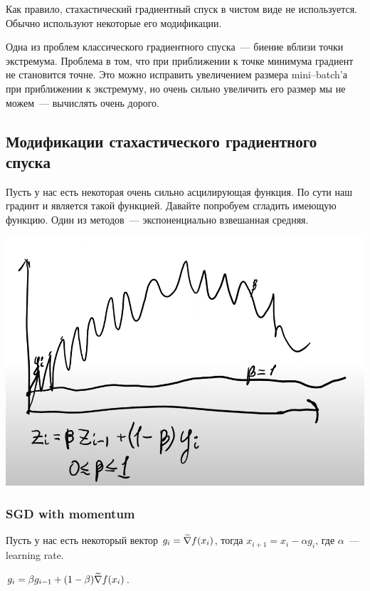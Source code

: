 Как правило, стахастический градиентный спуск в чистом виде не используется. Обычно используют некоторые его модификации.

Одна из проблем классического градиентного спуска~--- биение вблизи точки экстремума. Проблема в том, что при приближении к точке минимума градиент не становится точне. Это можно исправить увеличением размера mini--batch'а при приближении к экстремуму, но очень сильно увеличить его размер мы не можем~--- вычислять очень дорого.

\subsection{Модификации стахастического градиентного спуска}

Пусть у нас есть некоторая очень сильно асцилирующая функция. По сути наш градинт и является такой функцией. Давайте попробуем сгладить имеющую функцию. Один из методов~--- экспоненциально взвешанная средняя.

\begin{center}
\includegraphics[scale=0.4]{img/exponential-median-method-function.png}
\end{center}

\subsubsection{SGD with momentum}

Пусть у нас есть некоторый вектор $g _i = \widetilde{\nabla} f (x_i)$, тогда $x_{i+1} = x_i - \alpha g_i$, где $\alpha$~--- learning rate.

$g_i = \beta g_{i - 1} + (1 - \beta) \widetilde{\nabla} f (x_i)$.

